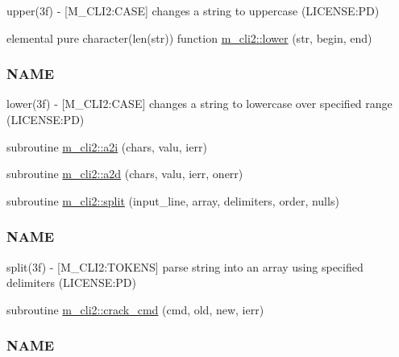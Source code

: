 \begin{DoxyCompactItemize}
\begin{DoxyCompactList}
upper(3f) -\/ \mbox{[}M\+\_\+\+C\+L\+I2\+:C\+A\+SE\mbox{]} changes a string to uppercase (L\+I\+C\+E\+N\+SE\+:PD) \end{DoxyCompactList}\item 
elemental pure character(len(str)) function \mbox{\hyperlink{namespacem__cli2_a6d2d93ab8471667e632bf7a0e95ebd13}{m\+\_\+cli2\+::lower}} (str, begin, end)
\begin{DoxyCompactList}\small\item\em \subsubsection*{N\+A\+ME}

lower(3f) -\/ \mbox{[}M\+\_\+\+C\+L\+I2\+:C\+A\+SE\mbox{]} changes a string to lowercase over specified range (L\+I\+C\+E\+N\+SE\+:PD) \end{DoxyCompactList}\item 
subroutine \mbox{\hyperlink{namespacem__cli2_a0be58233adafc0bf10dfe69300a05b9f}{m\+\_\+cli2\+::a2i}} (chars, valu, ierr)
\item 
subroutine \mbox{\hyperlink{namespacem__cli2_ad9e1de0ea9d2b4ed758b2a76bf143bd2}{m\+\_\+cli2\+::a2d}} (chars, valu, ierr, onerr)
\item 
subroutine \mbox{\hyperlink{namespacem__cli2_a6578e29ee4dc56651528e7e0acd29665}{m\+\_\+cli2\+::split}} (input\+\_\+line, array, delimiters, order, nulls)
\begin{DoxyCompactList}\small\item\em \subsubsection*{N\+A\+ME}

split(3f) -\/ \mbox{[}M\+\_\+\+C\+L\+I2\+:T\+O\+K\+E\+NS\mbox{]} parse string into an array using specified delimiters (L\+I\+C\+E\+N\+SE\+:PD) \end{DoxyCompactList}\item 
subroutine \mbox{\hyperlink{namespacem__cli2_a710b26995119aee101959555b1bac8e2}{m\+\_\+cli2\+::crack\+\_\+cmd}} (cmd, old, new, ierr)
\begin{DoxyCompactList}\small\item\em \subsubsection*{N\+A\+ME}


\end{DoxyCompactList}
\end{DoxyCompactItemize}
